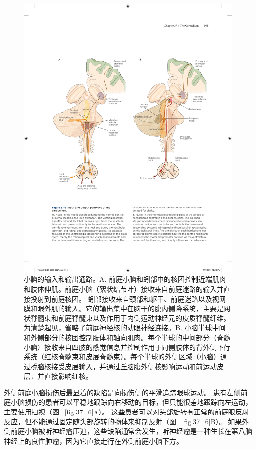 \begin{figure}[htbp]
	\centering
	\includegraphics[width=0.9\linewidth]{chap37/fig_37_5}
	\caption{小脑的输入和输出通路。A. 前庭小脑和蚓部中的核团控制近端肌肉和肢体伸肌。前庭小脑（絮状结节叶）接收来自前庭迷路的输入并直接投射到前庭核团。 蚓部接收来自颈部和躯干、前庭迷路以及视网膜和眼外肌的输入。它的输出集中在脑干的腹内侧降系统，主要是网状脊髓束和前庭脊髓束以及作用于内侧运动神经元的皮质脊髓纤维。为清楚起见，省略了前庭神经核的动眼神经连接。B. 小脑半球中间和外侧部分的核团控制肢体和轴向肌肉。每个半球的中间部分（脊髓小脑）接收来自四肢的感觉信息并控制作用于同侧肢体的背外侧下行系统（红核脊髓束和皮层脊髓束）。每个半球的外侧区域（小脑）通过桥脑核接受皮层输入，并通过丘脑腹外侧核影响运动和前运动皮层，并直接影响红核。}
	\label{fig:37_5}
\end{figure}


外侧前庭小脑损伤后最显着的缺陷是向损伤侧的平滑追踪眼球运动。
患有左侧前庭小脑损伤的患者可以平稳地跟踪向右移动的目标，但只能很差地跟踪向左运动，主要使用扫视（图 ~\ref{fig:37_6}A）。
这些患者可以对头部旋转有正常的前庭眼反射反应，但不能通过固定随头部旋转的物体来抑制反射（图 ~\ref{fig:37_6}B）。
如果外侧前庭小脑被听神经瘤压迫，这些缺陷通常会发生，听神经瘤是一种生长在第八脑神经上的良性肿瘤，因为它直接走行在外侧前庭小脑下方。



